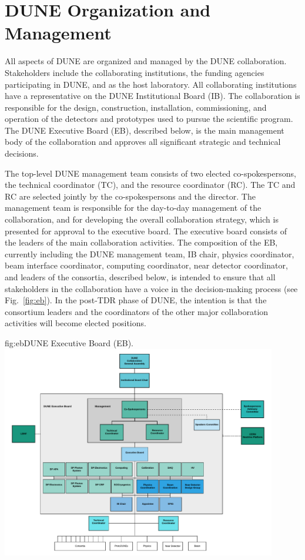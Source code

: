 \section{DUNE Organization and Management}

All aspects of DUNE are organized and managed by the DUNE collaboration.  Stakeholders include the collaborating institutions, the funding agencies participating in DUNE, and \fnal as the host laboratory.  All collaborating institutions have a representative on the DUNE Institutional Board (IB). The collaboration is responsible for the design, construction, installation, commissioning, and operation of the detectors and prototypes used to pursue the scientific program. The DUNE Executive Board (EB), described below, is the main management body of the collaboration and approves all significant strategic and technical decisions.

The top-level DUNE management team consists of two elected co-spokespersons, the technical coordinator (TC), and the resource coordinator (RC). The TC and RC are selected jointly by the co-spokespersons and the \fnal director. The management team is responsible for the day-to-day management of the collaboration, and for developing the overall collaboration strategy, which is presented for approval to the executive board. The executive board consists of the leaders of the main collaboration activities. The composition of the EB, currently including the DUNE management team, IB chair, physics coordinator, beam interface coordinator, computing coordinator, near detector coordinator, and leaders of the  consortia, described below, is intended to ensure
that all stakeholders in the collaboration have a voice in the decision-making process (see Fig.~\ref{fig:eb}). 
In the post-TDR phase of DUNE, the intention is that the consortium leaders and the coordinators of the other major collaboration activities will become elected positions.

\begin{dunefigure}	
{fig:eb}{DUNE Executive Board (EB).}
\includegraphics[width=0.9\textwidth]{graphics/eb.pdf}
\end{dunefigure}

